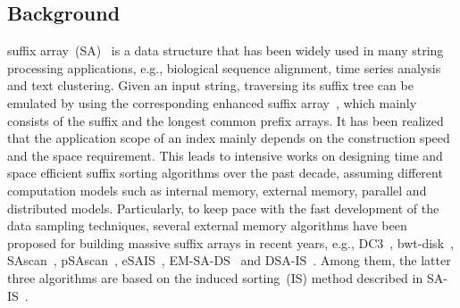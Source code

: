\documentclass[10pt,journal,compsoc]{IEEEtran}
\begin{document}
%
\IEEEpeerreviewmaketitle



\subsection{Background}
 suffix array~(SA)~\cite{Manber1993} is a data structure that has been widely used in many string processing applications, e.g., biological sequence alignment, time series analysis and text clustering. Given an input string, traversing its suffix tree can be emulated by using the corresponding enhanced suffix array~\cite{Abouelhodaa2004}, which mainly consists of the suffix and the longest common prefix arrays. It has been realized that the application scope of an index mainly depends on the construction speed and the space requirement. This leads to intensive works on designing time and space efficient suffix sorting algorithms over the past decade, assuming different computation models such as internal memory, external memory, parallel and distributed models. Particularly, to keep pace with the fast development of the data sampling techniques, several external memory algorithms have been proposed for building massive suffix arrays in recent years, e.g., DC3~\cite{Dementiev2008a}, bwt-disk~\cite{Ferragina2012}, SAscan~\cite{Karkkainen2014}, pSAscan~\cite{Karkkainen2015}, eSAIS~\cite{Bingmann2013}, EM-SA-DS~\cite{Nong2014} and DSA-IS~\cite{Nong2015}. Among them, the latter three algorithms are based on the induced sorting~(IS) method described in SA-IS~\cite{Nong2011}.
\end{document}
